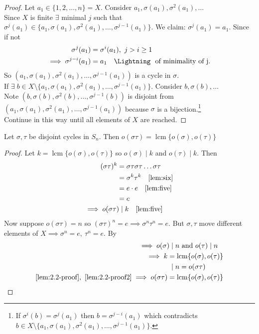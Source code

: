 \begin{proof}
Let $a_1 \in \{ 1, 2, \dots, n \} = X$.
Consider $a_1, \sigma(a_1), \sigma^2(a_1), \dots$\\
Since $X$ is finite $\exists$ minimal $j$ such that $\sigma^j(a_1) \in \{ a_1, \sigma(a_1), \sigma^2(a_1), \dots, \sigma^{j-1}(a_1) \}$.
We claim: $\sigma^j(a_1) = a_1$.
Since if not \begin{align*}
    \sigma^j(a_1) &= \sigma^i(a_1),\ j > i \geq 1 \\
    \implies \sigma^{j - i}(a_1) &= a_1 \quad \text{\Lightning \ of minimality of j.}
\end{align*}
So $\left( a_1, \sigma(a_1), \sigma^2(a_1), \dots, \sigma^{j-1}(a_1) \right)$ is a cycle in $\sigma$.\\
If $\exists \; b \in X \setminus \{ a_1, \sigma(a_1), \sigma^2(a_1), \dots, \sigma^{j-1}(a_1) \}$.
Consider $b, \sigma(b), \dots$\\
Note $\left(b, \sigma(b), \sigma^2(b), \dots, \sigma^{j-1}(b) \right)$ is disjoint from $\left( a_1, \sigma(a_1), \sigma^2(a_1), \dots, \sigma^{j-1}(a_1) \right)$ because $\sigma$ is a bijection.\footnote{If $\sigma^i(b) = \sigma^j(a_1)$ then $b = \sigma^{j - i}(a_1)$ which contradicts $b \in X \setminus \{ a_1, \sigma(a_1), \sigma^2(a_1), \dots, \sigma^{j-1}(a_1) \}$.}\\
Continue in this way until all elements of $X$ are reached.
\end{proof}

\begin{lemma}
Let $\sigma, \tau$ be disjoint cycles in $S_n$.
Then $o(\sigma \tau) = \operatorname{lcm} \{ o(\sigma), o(\tau) \}$
\end{lemma}

\begin{proof}
Let $k = \operatorname{lcm} \{ o(\sigma), o(\tau) \}$ so $o(\sigma) \mid k$ and $o(\tau) \mid k$.
Then \begin{align}
    (\sigma \tau)^k &= \sigma \tau \sigma \tau \dots \sigma \tau \notag\\
    &= \sigma^k \tau^k \quad \text{\Cref{lem:six}} \notag \\
    &= e \cdot e \quad \text{\Cref{lem:five}} \notag\\
    &= e \notag \\
    \implies o(\sigma \tau) \mkern-5mu &\;\mid k \quad \text{\Cref{lem:five}} \label{lem:2.2-proof}
\end{align}
Now suppose $o(\sigma \tau) = n$ so $(\sigma \tau)^n = e \implies \sigma^n \tau^n = e$.
But $\sigma, \tau$ move different elements of $X \implies \sigma^n = e,\ \tau^n = e$.
By 
\begin{align}
    \implies o(\sigma) \mkern-5mu &\;\mid n \text{ and } o(\tau) \mid n \notag\\
    \implies k &= \operatorname{lcm} \{ o(\sigma), o(\tau) \} \notag\\
    &\;\mid n = o(\sigma \tau) \label{lem:2.2-proof2} \\
    \cref{lem:2.2-proof},\ \cref{lem:2.2-proof2} \implies o(\sigma \tau) &= \operatorname{lcm} \{ o(\sigma), o(\tau) \} \notag
\end{align}
\end{proof}

